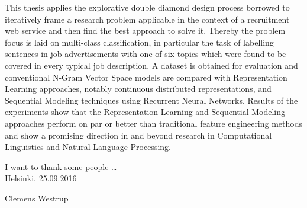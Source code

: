 \begin{abstractpage}[english]

This thesis applies the explorative double diamond design process borrowed to iteratively frame a research problem applicable in the context of a recruitment web service and then find the best approach to solve it. Thereby the problem focus is laid on multi-class classification, in particular the task of labelling sentences in job advertisements with one of six topics which were found to be covered in every typical job description. A dataset is obtained for evaluation and conventional N-Gram Vector Space models are compared with Representation Learning approaches, notably continuous distributed representations, and Sequential Modeling techniques using Recurrent Neural Networks. Results of the experiments show that the Representation Learning and Sequential Modeling approaches perform on par or better than traditional feature engineering methods and show a promising direction in and beyond research in Computational Linguistics and Natural Language Processing.

\end{abstractpage}

\newpage




%



I want to thank some people \ldots
\\

\vspace{5cm}
Helsinki, 25.09.2016

\vspace{5mm}
{\hfill Clemens Westrup \hspace{1cm}}

